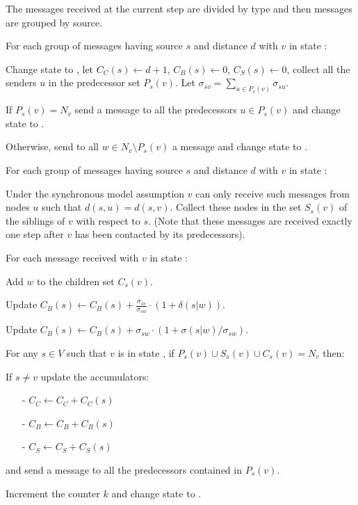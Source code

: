 \begin{algosteps}
  \item The messages received at the current step are divided by type and then \mdisc{} messages are grouped by source.
  \item For each group of  messages having source $s$ and distance $d$ with $v$ in state :
  \begin{algosteps}
    \item Change state to , let $C_C(s) \gets d+1$, $C_B(s) \gets 0$, $C_S(s) \gets 0$, collect all the senders $u$ in the predecessor set $P_s(v)$. Let $\sigma_{sv} = \sum_{u \in P_s(v)} \sigma_{su}$.
    \item If $P_s(v) = N_v$ send a  message to all the predecessors $u \in P_s(v)$ and change state to . 
    \item Otherwise, send to all $w \in N_v \setminus P_s(v)$ a  message and change state to .
  \end{algosteps}
    \item For each group of  messages having source $s$ and distance $d$ with $v$ in state :
    \begin{algosteps}
      \item Under the synchronous model assumption $v$ can only receive such messages from nodes $u$ such that $d(s,u) = d(s,v)$. Collect these nodes in the set $S_s(v)$ of the siblings of $v$ with respect to $s$. (Note that these messages are received exactly one step after $v$ has been contacted by its predecessors).
    \end{algosteps}
  \item For each  message received with $v$ in state :
  \begin{algosteps}
      \item Add $w$ to the children set $C_s(v)$.
      \item Update $C_B(s) \gets C_B(s) + \frac{\sigma_{sv}}{\sigma_{sw}} \cdot (1 + \delta(s|w))$.
      \item Update $C_B(s) \gets C_B(s) + \sigma_{sw} \cdot ( 1 + \sigma(s|w)/\sigma_{sw} )$.
    \end{algosteps}
  \item For any $s \in V$ such that $v$ is in state , if $P_s(v) \cup S_s(v) \cup C_s(v) = N_v$ then:
  \begin{algosteps}
      \item If $s \neq v$ update the accumulators:
      \begin{itemize}
        \item[-] $C_C \gets C_C + C_C(s)$
        \item[-] $C_B \gets C_B + C_B(s)$
        \item[-] $C_S \gets C_S + C_S(s)$
      \end{itemize}
      and send a  message to all the predecessors contained in $P_s(v)$.
      \item Increment the counter $k$ and change state to .
    \end{algosteps}
\end{algosteps}
